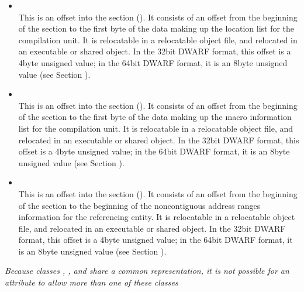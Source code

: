\begin{itemize}
\item {} \\
This is an offset into the 
section
(). It consists of an offset from the
beginning of the 
section to the first byte of
the data making up the location list for the compilation
unit. 
It is relocatable in a relocatable object file, and
relocated in an executable or shared object. In the 32\dash bit
DWARF format, this offset is a 4\dash byte unsigned value;
in the 64\dash bit DWARF format, it is an 8\dash byte unsigned value
(see Section ).


\item {} \\
This is an offset into the 
 section
(). It consists of an offset from the
beginning of the  
section to the first byte of
the data making up the macro information list for the compilation
unit. 
It is relocatable in a relocatable object file, and
relocated in an executable or shared object. In the 32\dash bit
DWARF format, this offset is a 4\dash byte unsigned value;
in the 64\dash bit DWARF format, it is an 8\dash byte unsigned value
(see Section ).

\item {} \\
This is an offset into the  section
(). 
It consists of an
offset from the beginning of the 
 section
to the beginning of the non\dash contiguous address ranges
information for the referencing entity.  
It is relocatable in
a relocatable object file, and relocated in an executable or
shared object. In the 32\dash bit DWARF format, this offset
is a 4\dash byte unsigned value; in the 64\dash bit DWARF
format, it is an 8\dash byte unsigned value (see Section
).
\end{itemize}

\textit{Because classes , ,  and 
share a common representation, it is not possible for an
attribute to allow more than one of these classes}


